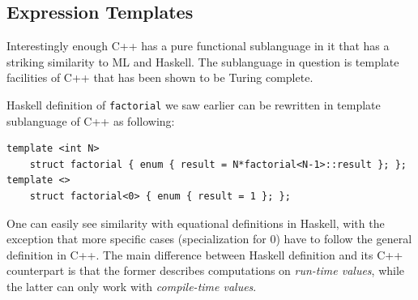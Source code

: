 \documentclass[preprint]{sigplanconf}
\makeatletter
\DeclareRobustCommand{\code}[1]{{\lstinline[breaklines=false,escapechar=@]{#1}}}
\makeatother
\begin{document}


\subsection{Expression Templates}

Interestingly enough C++ has a pure functional sublanguage in it that has a 
striking similarity to ML and Haskell. The sublanguage in question is template 
facilities of C++ that has been shown to be Turing 
complete\cite{veldhuizen:templates_turing_complete}. 

Haskell definition of \code{factorial} we saw earlier can be rewritten in 
template sublanguage of C++ as following:

\begin{lstlisting}
template <int N> 
    struct factorial { enum { result = N*factorial<N-1>::result }; };
template <>
    struct factorial<0> { enum { result = 1 }; };
\end{lstlisting}

\noindent
One can easily see similarity with equational definitions in Haskell, with the 
exception that more specific cases (specialization for 0) have to follow the 
general definition in C++. The main difference between Haskell definition and 
its C++ counterpart is that the former describes computations on \emph{run-time 
values}, while the latter can only work with \emph{compile-time values}.
\end{document}
